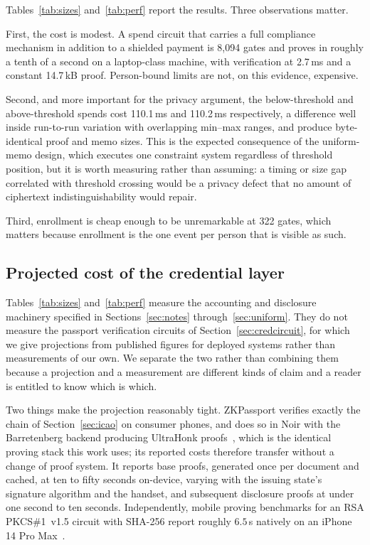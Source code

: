 \documentclass[11pt,a4paper]{article}
\theoremstyle{definition}
\theoremstyle{plain}
\theoremstyle{remark}
\begin{document}
Tables~\ref{tab:sizes} and~\ref{tab:perf} report the results. Three observations matter.

First, the cost is modest. A spend circuit that carries a full compliance mechanism in addition to a shielded payment is 8{,}094 gates and proves in roughly a tenth of a second on a laptop-class machine, with verification at 2.7\,ms and a constant 14.7\,kB proof. Person-bound limits are not, on this evidence, expensive.

Second, and more important for the privacy argument, the below-threshold and above-threshold spends cost 110.1\,ms and 110.2\,ms respectively, a difference well inside run-to-run variation with overlapping min--max ranges, and produce byte-identical proof and memo sizes. This is the expected consequence of the uniform-memo design, which executes one constraint system regardless of threshold position, but it is worth measuring rather than assuming: a timing or size gap correlated with threshold crossing would be a privacy defect that no amount of ciphertext indistinguishability would repair.

Third, enrollment is cheap enough to be unremarkable at 322 gates, which matters because enrollment is the one event per person that is visible as such.

\subsection{Projected cost of the credential layer}
\label{sec:credcost}

Tables~\ref{tab:sizes} and~\ref{tab:perf} measure the accounting and disclosure machinery specified in Sections~\ref{sec:notes} through~\ref{sec:uniform}. They do not measure the passport verification circuits of Section~\ref{sec:credcircuit}, for which we give projections from published figures for deployed systems rather than measurements of our own. We separate the two rather than combining them because a projection and a measurement are different kinds of claim and a reader is entitled to know which is which.

Two things make the projection reasonably tight. ZKPassport verifies exactly the chain of Section~\ref{sec:icao} on consumer phones, and does so in Noir with the Barretenberg backend producing UltraHonk proofs~\cite{zkpassport}, which is the identical proving stack this work uses; its reported costs therefore transfer without a change of proof system. It reports base proofs, generated once per document and cached, at ten to fifty seconds on-device, varying with the issuing state's signature algorithm and the handset, and subsequent disclosure proofs at under one second to ten seconds. Independently, mobile proving benchmarks for an RSA PKCS\#1~v1.5 circuit with SHA-256 report roughly $6.5$\,s natively on an iPhone 14 Pro Max~\cite{mopro}.
\end{document}
